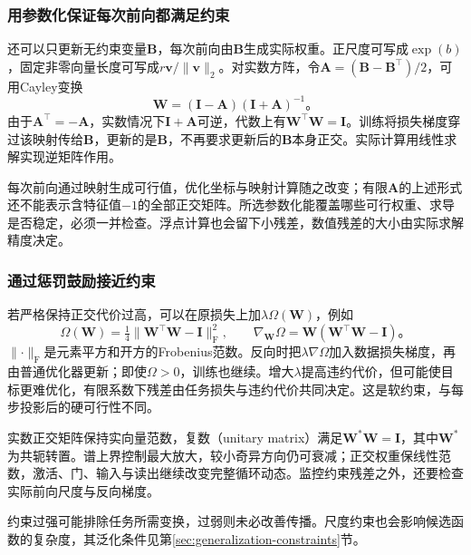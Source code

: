 \subsubsection{用参数化保证每次前向都满足约束}

还可以只更新无约束变量$\bm B$，每次前向由$\bm B$生成实际权重。正尺度可写成$\exp(b)$，固定非零向量长度可写成$r\bm v/\lVert\bm v\rVert_2$。对实数方阵，令$\bm A=(\bm B-\bm B^{\top})/2$，可用Cayley变换
\begin{equation}
  \bm W=(\bm I-\bm A)(\bm I+\bm A)^{-1}\text{。}
  \label{eq:training-cayley-parameterization}
\end{equation}
由于$\bm A^{\top}=-\bm A$，实数情况下$\bm I+\bm A$可逆，代数上有$\bm W^{\top}\bm W=\bm I$。训练将损失梯度穿过该映射传给$\bm B$，更新的是$\bm B$，不再要求更新后的$\bm B$本身正交。实际计算用线性求解实现逆矩阵作用。

每次前向通过映射生成可行值，优化坐标与映射计算随之改变；有限$\bm A$的上述形式还不能表示含特征值$-1$的全部正交矩阵。所选参数化能覆盖哪些可行权重、求导是否稳定，必须一并检查。浮点计算也会留下小残差，数值残差的大小由实际求解精度决定。

\subsubsection{通过惩罚鼓励接近约束}

若严格保持正交代价过高，可以在原损失上加$\lambda\Omega(\bm W)$，例如
\begin{equation}
  \Omega(\bm W)=\tfrac14\lVert\bm W^{\top}\bm W-\bm I\rVert_{\mathrm F}^2,
  \qquad\nabla_{\bm W}\Omega=\bm W(\bm W^{\top}\bm W-\bm I)\text{。}
  \label{eq:training-orthogonality-penalty}
\end{equation}
$\lVert\cdot\rVert_{\mathrm F}$是元素平方和开方的Frobenius范数。反向时把$\lambda\nabla\Omega$加入数据损失梯度，再由普通优化器更新；即使$\Omega>0$，训练也继续。增大$\lambda$提高违约代价，但可能使目标更难优化，有限系数下残差由任务损失与违约代价共同决定。这是软约束，与每步投影后的硬可行性不同。

实数正交矩阵保持实向量范数，复数（unitary matrix）满足$\bm W^*\bm W=\bm I$，其中$\bm W^*$为共轭转置。谱上界控制最大放大，较小奇异方向仍可衰减；正交权重保线性范数，激活、门、输入与读出继续改变完整循环动态。监控约束残差之外，还要检查实际前向尺度与反向梯度。

约束过强可能排除任务所需变换，过弱则未必改善传播。尺度约束也会影响候选函数的复杂度，其泛化条件见第\ref{sec:generalization-constraints}节。

